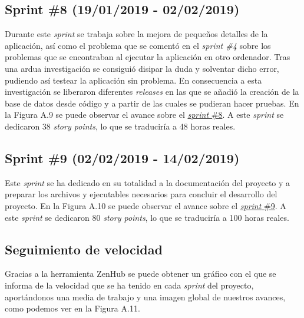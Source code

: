 
\subsection{Sprint \#8 (19/01/2019 - 02/02/2019)}

Durante este \textit{sprint} se trabaja sobre la mejora de pequeños detalles de la aplicación, así como el problema que se comentó en el \textit{sprint \#4} sobre los problemas que se encontraban al ejecutar la aplicación en otro ordenador. Tras una ardua investigación se consiguió disipar la duda y solventar dicho error, pudiendo así testear la aplicación sin problema. En consecuencia a esta investigación se liberaron diferentes \textit{releases} en las que se añadió la creación de la base de datos desde código y a partir de las cuales se pudieran hacer pruebas. En la Figura A.9 se puede observar el avance sobre el \href{https://github.com/FranBurgos/TFG/milestone/9?closed=1}{\textit{sprint} \#8}. A este \textit{sprint} se dedicaron 38 \textit{story points}, lo que se traduciría a 48 horas reales.


\subsection{Sprint \#9 (02/02/2019 - 14/02/2019)}

Este \textit{sprint} se ha dedicado en su totalidad a la documentación del proyecto y a preparar los archivos y ejecutables necesarios para concluir el desarrollo del proyecto. En la Figura A.10 se puede observar el avance sobre el \href{https://github.com/FranBurgos/TFG/milestone/10?closed=1}{\textit{sprint} \#9}. A este \textit{sprint} se dedicaron 80 \textit{story points}, lo que se traduciría a 100 horas reales.


\subsection{Seguimiento de velocidad}

Gracias a la herramienta ZenHub se puede obtener un gráfico con el que se informa de la velocidad que se ha tenido en cada \textit{sprint} del proyecto, aportándonos una media de trabajo y una imagen global de nuestros avances, como podemos ver en la Figura A.11.


